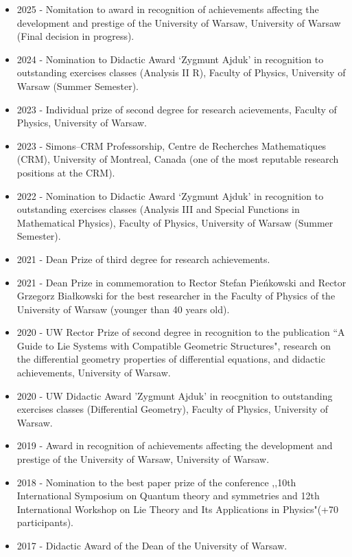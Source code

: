 \documentclass[12pt,reqno]{amsbook}
\begin{document}
\begin{itemize}
	\item 2025 - Nomitation to award in recognition of achievements affecting the development and prestige of the University of Warsaw, University of Warsaw (Final decision in progress).
	\item 2024 - Nomination to Didactic   Award `Zygmunt Ajduk' in recognition to outstanding exercises classes (Analysis II R), Faculty of Physics, University of Warsaw (Summer Semester).
        \item 2023 - Individual prize of second degree for research acievements, Faculty of Physics, University of Warsaw.
        \item 2023 - Simons--CRM Professorship, Centre de Recherches Mathematiques (CRM), University of Montreal, Canada (one of the most reputable research positions at the CRM).
        \item 2022 - Nomination to Didactic     Award `Zygmunt Ajduk' in recognition to outstanding exercises classes (Analysis III and Special Functions in Mathematical Physics), Faculty of Physics, University of Warsaw (Summer Semester).
        \item 2021 - Dean Prize of third degree for research achievements.
        \item 2021 - Dean Prize in commemoration to Rector Stefan Pie\'nkowski and Rector Grzegorz Bia\l kowski for the best researcher in the Faculty of Physics of the University of Warsaw (younger than 40 years old).
        \item 2020 - UW Rector Prize of second degree in recognition to the publication ``A Guide to Lie Systems with Compatible Geometric Structures", research on the differential geometry properties of differential equations, and didactic achievements, University of Warsaw.
        \item 2020 - UW Didactic Award 'Zygmunt Ajduk' in reocgnition to outstanding exercises classes (Differential Geometry), Faculty of Physics, University of Warsaw.
 \item 2019 - Award in recognition of achievements affecting the development and prestige of the University of Warsaw, University of Warsaw.
        \item 2018 -  Nomination to the best paper prize of the conference ,,10th International Symposium on Quantum theory and symmetries and 12th International Workshop on Lie Theory and Its Applications in Physics"(+70 participants).
        \item 2017 - Didactic Award of the Dean of the University of Warsaw.

\end{itemize}
\end{document}
